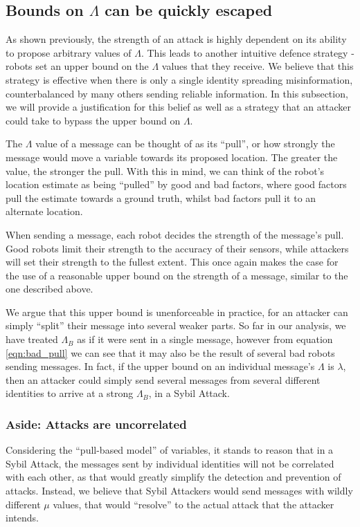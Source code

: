 \subsection{Bounds on $\Lambda$ can be quickly escaped} \label{hyp:2}
As shown previously, the strength of an attack is highly dependent on its ability to propose arbitrary values of $\Lambda$. This leads to another intuitive defence strategy - robots set an upper bound on the $\Lambda$ values that they receive. We believe that this strategy is effective when there is only a single identity spreading misinformation, counterbalanced by many others sending reliable information. In this subsection, we will provide a justification for this belief as well as a strategy that an attacker could take to bypass the upper bound on $\Lambda$.

The $\Lambda$ value of a message can be thought of as its ``pull'', or how strongly the message would move a variable towards its proposed location. The greater the value, the stronger the pull.  With this in mind, we can think of the robot's location estimate as being ``pulled'' by good and bad factors, where good factors pull the estimate towards a ground truth, whilst bad factors pull it to an alternate location. 

When sending a message, each robot decides the strength of the message's pull. Good robots limit their strength to the accuracy of their sensors, while attackers will set their strength to the fullest extent. This once again makes the case for the use of a reasonable upper bound on the strength of a message, similar to the one described above.

We argue that this upper bound is unenforceable in practice, for an attacker can simply ``split'' their message into several weaker parts. So far in our analysis, we have treated $\Lambda_B$ as if it were sent in a single message, however from equation \ref{eqn:bad_pull} we can see that it may also be the result of several bad robots sending messages. In fact, if the upper bound on an individual message's $\Lambda$ is $\lambda$, then an attacker could simply send several messages from several different identities to arrive at a strong $\Lambda_B$, in a Sybil Attack. 
\subsubsection{Aside: Attacks are uncorrelated} \label{hyp:2.5}
Considering the ``pull-based model'' of variables, it stands to reason that in a Sybil Attack, the messages sent by individual identities will not be correlated with each other, as that would greatly simplify the detection and prevention of attacks. Instead, we believe that Sybil Attackers would send messages with wildly different $\mu$ values, that would ``resolve'' to the actual attack that the attacker intends.

